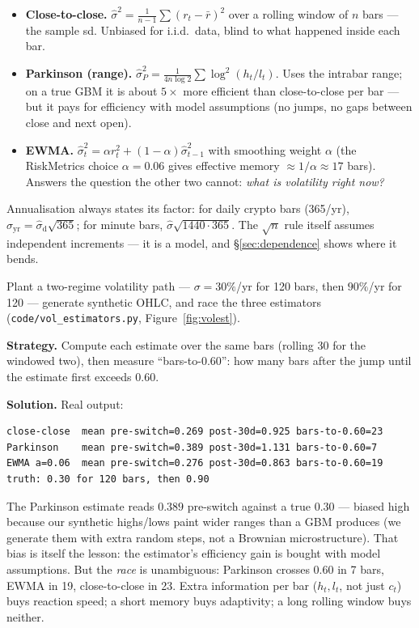 \begin{itemize}
\item \textbf{Close-to-close.} $\hat\sigma^2 = \frac1{n-1}\sum
(r_{t}-\bar r)^2$ over a rolling window of $n$ bars --- the sample sd.
Unbiased for i.i.d.\ data, blind to what happened inside each bar.
\item \textbf{Parkinson (range).} $\hat\sigma^2_P =
\frac{1}{4n\log 2}\sum \log^2(h_t/l_t)$. Uses the intrabar range; on a
true GBM it is about $5\times$ more efficient than close-to-close
per bar --- but it pays for efficiency with model assumptions (no
jumps, no gaps between close and next open).
\item \textbf{EWMA.} $\hat\sigma_t^2 = \alpha r_t^2 +
(1-\alpha)\hat\sigma_{t-1}^2$ with smoothing weight $\alpha$ (the
RiskMetrics choice $\alpha=0.06$ gives effective memory $\approx
1/\alpha\approx 17$ bars). Answers the question the other two cannot:
\emph{what is volatility right now?}
\end{itemize}

Annualisation always states its factor: for daily crypto bars
(365/yr), $\hat\sigma_{\mathrm{yr}} = \hat\sigma_{\mathrm{d}}\sqrt{365}$;
for minute bars, $\hat\sigma\sqrt{1440\cdot 365}$. The $\sqrt{n}$ rule
itself assumes independent increments --- it is a model, and
\S\ref{sec:dependence} shows where it bends.

\begin{example}
\label{ex:volrace}
Plant a two-regime volatility path --- $\sigma=30\%$/yr for 120 bars,
then $90\%$/yr for 120 --- generate synthetic OHLC, and race the three
estimators (\texttt{code/vol\_estimators.py}, Figure~\ref{fig:volest}).

\textbf{Strategy.} Compute each estimate over the same bars (rolling
30 for the windowed two), then measure ``bars-to-$0.60$'': how many
bars after the jump until the estimate first exceeds $0.60$.

\textbf{Solution.} Real output:
\begin{lstlisting}[numbers=none]
close-close  mean pre-switch=0.269 post-30d=0.925 bars-to-0.60=23
Parkinson    mean pre-switch=0.389 post-30d=1.131 bars-to-0.60=7
EWMA a=0.06  mean pre-switch=0.276 post-30d=0.863 bars-to-0.60=19
truth: 0.30 for 120 bars, then 0.90
\end{lstlisting}
The Parkinson estimate reads $0.389$ pre-switch against a true
$0.30$ --- biased high because our synthetic highs/lows paint wider
ranges than a GBM produces (we generate them with extra random steps,
not a Brownian microstructure). That bias is itself the lesson: the
estimator's efficiency gain is bought with model assumptions. But the
\emph{race} is unambiguous: Parkinson crosses $0.60$ in 7 bars, EWMA
in 19, close-to-close in 23. Extra information per bar
($h_t,l_t$, not just $c_t$) buys reaction speed; a short memory buys
adaptivity; a long rolling window buys neither.
\end{example}

